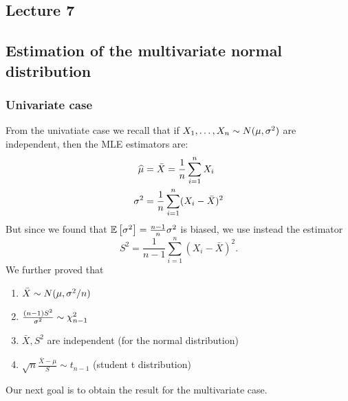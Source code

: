


\subsection*{Lecture 7}

\subsection{Estimation of the multivariate normal distribution}
\subsubsection{Univariate case}
From the univatiate case we recall that if $X_1,\dots,X_n \sim N(\mu, {\sigma^2})$ are independent, then the MLE estimators are:
\begin{align*}
    \widehat{\mu} &= \bar{X} = \frac{1}{n} \sum_{i=1}^n X_i \\
    \sigma^2 &= \frac{1}{n} \sum_{i=1}^n (X_i-\bar{X})^2
\end{align*}
But since we found that $\mathbb{E}\left[\sigma^2\right]=\frac{n-1}{n} \sigma^2$ is biased, we use instead the estimator
$$
    S^2 = \frac{1}{n-1} \sum_{i=1}^n (X_i-\bar{X})^2.
$$
We further proved that
\begin{enumerate}
    \item $\bar{X} \sim N(\mu, \sigma^2/n)$
    \item $\frac{(n-1)S^2}{\sigma^2} \sim \chi^2_{n-1}$
    \item $\bar{X}, S^2$ are independent (for the normal distribution)
    \item $\sqrt{n} \frac{\bar{X}-\mu}{S} \sim t_{n-1}$ (student t distribution)
\end{enumerate}
Our next goal is to obtain the result for the multivariate case. 

